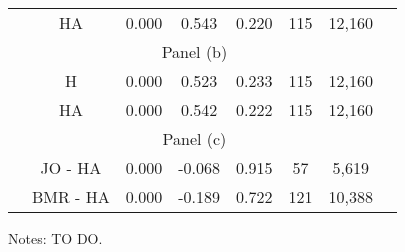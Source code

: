 \begin{table}[h]
{\begin{threeparttable}
\begin{tabular}{lccccccc}
			& HA                                                          & 0.000\sym{***}                                           & 0.543                          & 0.220                                                            & 115       &12,160                                                  \\
			\multicolumn{7}{c}{Panel (b)}   \\
			& H                                                           & 0.000\sym{***}                                           & 0.523                          & 0.233                                                            &    115         &12,160                                                \\
			& HA                                                          & 0.000\sym{***}                                           & 0.542                          & 0.222                                                            & 115    &12,160                                                     \\
			\multicolumn{7}{c}{Panel (c)}
			\\
			& JO - HA& 0.000\sym{***} & -0.068 & 0.915 & 57 & 5,619\\
						 & BMR - HA & 0.000\sym{***} & -0.189 & 0.722 & 121& 10,388 \\ \hline \hline
			\end{tabular}
			\begin{tablenotes}
				\footnotesize{Notes: TO DO.}
			\end{tablenotes}
		\end{threeparttable}
		}
	\end{table}